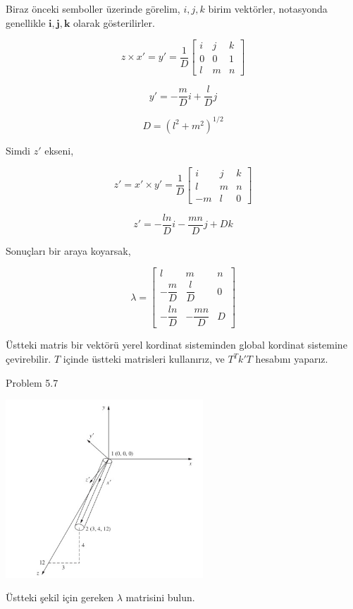 \documentclass[12pt,fleqn]{article}\usepackage{../../common}
\begin{document}
Biraz önceki semboller üzerinde görelim, $i,j,k$ birim vektörler, notasyonda
genellikle $\mathbf{i},\mathbf{j},\mathbf{k}$ olarak gösterilirler.

$$
z \times x' = y' = \frac{1}{D}
\left[\begin{array}{ccc}
i & j & k \\ 0 & 0 & 1 \\ l & m & n
\end{array}\right]
$$

$$
y' = - \frac{m}{D} i + \frac{l}{D} j
$$

$$
D = (l^2 + m^2)^{1/2}
$$

Simdi $z'$ ekseni,

$$
z' = x' \times y' = \frac{1}{D}
\left[\begin{array}{ccc}
i & j & k \\ l & m & n \\ -m & l & 0
\end{array}\right]
$$

$$
z' = -\frac{ln}{D} i - \frac{mn}{D} j + D k 
$$

Sonuçları bir araya koyarsak,

$$
\renewcommand*{\arraystretch}{2.0}
\lambda = \left[\begin{array}{ccc}
l & m & n \\
-\dfrac{m}{D} & \dfrac{l}{D} & 0 \\
-\dfrac{ln}{D} & -\dfrac{mn}{D} & D
\end{array}\right]
$$

Üstteki matris bir vektörü yerel kordinat sisteminden global kordinat sistemine
çevirebilir. $T$ içinde üstteki matrisleri kullanırız, ve $T^T k' T$ hesabını
yaparız.

Problem 5.7

\includegraphics[width=20em]{phy_020_strs_11_05.jpg}

Üstteki şekil için gereken $\lambda$ matrisini bulun.
\end{document}
